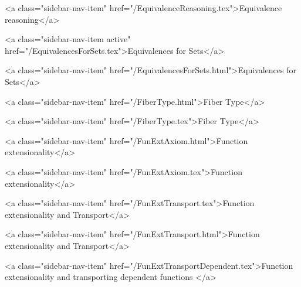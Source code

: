       
    
      
        
          <a class="sidebar-nav-item" href="/EquivalenceReasoning.tex">Equivalence reasoning</a>
        
      
    
      
        
          <a class="sidebar-nav-item active" href="/EquivalencesForSets.tex">Equivalences for Sets</a>
        
      
    
      
        
          <a class="sidebar-nav-item" href="/EquivalencesForSets.html">Equivalences for Sets</a>
        
      
    
      
        
          <a class="sidebar-nav-item" href="/FiberType.html">Fiber Type</a>
        
      
    
      
        
          <a class="sidebar-nav-item" href="/FiberType.tex">Fiber Type</a>
        
      
    
      
        
          <a class="sidebar-nav-item" href="/FunExtAxiom.html">Function extensionality</a>
        
      
    
      
        
          <a class="sidebar-nav-item" href="/FunExtAxiom.tex">Function extensionality</a>
        
      
    
      
        
          <a class="sidebar-nav-item" href="/FunExtTransport.tex">Function extensionality and Transport</a>
        
      
    
      
        
          <a class="sidebar-nav-item" href="/FunExtTransport.html">Function extensionality and Transport</a>
        
      
    
      
        
          <a class="sidebar-nav-item" href="/FunExtTransportDependent.tex">Function extensionality and transporting dependent functions </a>
        
      
    
